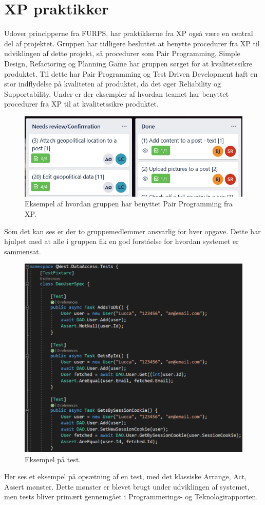 \section{XP praktikker}
Udover principperne fra FURPS, har praktikkerne fra XP også være en central del af projektet. Gruppen har tidligere besluttet at benytte procedurer fra XP til udviklingen af dette projekt, så procedurer som Pair Programming, Simple Design, Refactoring og Planning Game har gruppen sørget for at kvalitetssikre produktet. Til dette har Pair Programming og Test Driven Development\cite{Sommerville} haft en stor indflydelse på kvaliteten af produktet, da det øger Reliability og Supportability.
Under er der eksempler af hvordan teamet har benyttet procedurer fra XP til at kvalitetssikre produktet. 

\begin{figure}
    \includegraphics[width=\linewidth]{figures/pairprogramming.jpg}
    \caption{Eksempel af hvordan gruppen har benyttet Pair Programming fra XP.}
    \label{fig:Pair}
\end{figure}
Som det kan ses er der to gruppemedlemmer ansvarlig for hver opgave. Dette har hjulpet med at alle i gruppen fik en god forståelse for hvordan systemet er sammensat.


\begin{figure}
    \includegraphics[width=\linewidth]{figures/tests2.png}
    \caption{Eksempel på test.}
    \label{fig:Test}
\end{figure}
Her ses et eksempel på opsætning af en test, med det klassiske Arrange, Act, Assert mønster. Dette mønster er blevet brugt under udviklingen af systemet, men tests bliver primært gennemgået i Programmerings- og Teknologirapporten.

